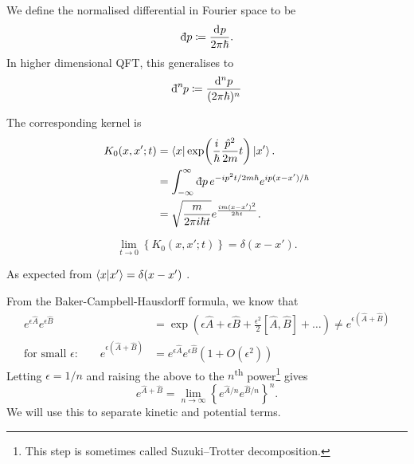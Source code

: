 \begin{definition}
  We define the normalised differential in Fourier space to be
  \begin{equation}
    \bdd{p} \coloneqq \frac{\dd[]{p}}{2 \pi \hbar}.
  \end{equation}
  In higher dimensional QFT, this generalises to
  \begin{equation}
    \bdd[n]{p} \coloneqq \frac{\dd[n]{p}}{(2 \pi \hbar)^n}
  \end{equation}
\end{definition}

The corresponding kernel is
\begin{align}
  K_0(x, x'; t) &= \bra{x}\exp(\frac{i}{\hbar} \frac{\hat{p}^2}{2m} t) \ket{x'}. \\
		&= \int_{-\infty}^{\infty}\bdd[]{p} e^{-i p^2 t / 2m \hbar} e^{i p (x - x') / \hbar} \\
		&= \sqrt{\frac{m}{2 \pi i \hbar t}} e^{\frac{im (x - x')^2}{2 \hbar t}}. \label{eq:1-kernel}
\end{align}
\begin{remark}
  \begin{equation}
    \lim_{t \to 0} \left\{ K_0(x, x'; t) \right\} = \delta(x - x').
  \end{equation}
\end{remark}
As expected from $\bra{x} \ket{x'} = \delta(x - x')$ .

From the Baker-Campbell-Hausdorff formula, we know that
\begin{align}
  e^{\epsilon \hat{A}} e^{\epsilon \hat{B}} &= \exp(\epsilon \hat{A} + \epsilon \hat{B} + \frac{\epsilon^2}{2} [\hat{A}, \hat{B}] + \dots) \neq e^{\epsilon(\hat{A} + \hat{B})} \\
  \text{for small $\epsilon$:} \qquad e^{\epsilon(\hat{A} + \hat{B})} &= e^{\epsilon \hat{A}} e^{\epsilon \hat{B}} (1 + O(\epsilon^2))
\end{align}
Letting $\epsilon = 1 / n$ and raising the above to the  $n$\textsuperscript{th} power\footnote{This step is sometimes called Suzuki--Trotter decomposition.} gives
\begin{equation}
  e^{\hat{A} + \hat{B}} = \lim_{n \to \infty} \left\{ e^{\hat{A} / n} e^{\hat{B} / n} \right\}^n.
\end{equation}
We will use this to separate kinetic and potential terms.

